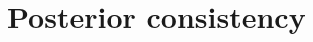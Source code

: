 \documentclass[aoas,preprint]{imsart}
\begin{document}
\section{Posterior consistency}

 
\end{document}

